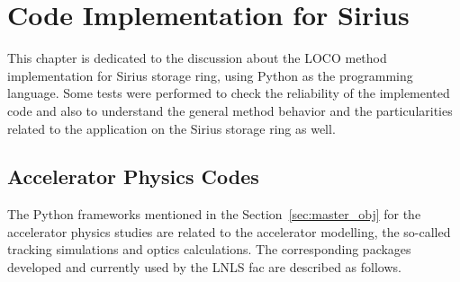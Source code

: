 \chapter{Code Implementation for Sirius}\label{chap:code_studies}
This chapter is dedicated to the discussion about the LOCO method implementation for Sirius storage ring, using Python as the programming language. Some tests were performed to check the reliability of the implemented code and also to understand the general method behavior and the particularities related to the application on the Sirius storage ring as well.

\section{Accelerator Physics Codes}
The Python frameworks mentioned in the Section~\ref{sec:master_obj} for the accelerator physics studies are related to the accelerator modelling, the so-called tracking simulations and optics calculations. The corresponding packages developed and currently used by the LNLS \gls{fac} are described as follows.

